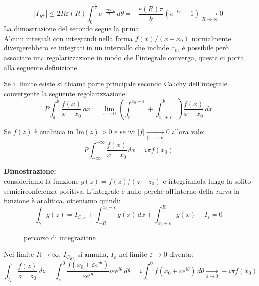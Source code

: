 \[|I_{R^+}| \leq 2R\varepsilon(R)\int_0^{\frac{\pi}{2}} e^{-\frac{2kR}{\pi}\theta}\,d\theta = -\frac{\varepsilon(R)\pi}{k}(e^{-kr}-1) \xrightarrow[R\to \infty]{} 0\]
La dimostrazione del secondo segue la prima.\\
\newline
Alcuni integrali con integrandi nella forma $f(x)/(x-x_0)$ normalmente divergerebbero se integrati in un intervallo che include $x_0$, è possibile però associare una regolarizzazione in modo che l'integrale converga, questo ci porta alla seguente definizione
\begin{dfn}
Se il limite esiste si chiama parte principale secondo Cauchy dell'integrale convergente la seguente regolarizzazione:
\[P\int_a^b\frac{f(x)}{x-x_0}\,dx := \lim_{\varepsilon\to0}\left(\int_a^{x_0-\varepsilon}+\int_{x_0+\varepsilon}^b\right)\frac{f(x)}{x-x_0}\,dx\]
\end{dfn}
\begin{lem}
Se $f(z)$ è analitica in $\text{Im}(z)>0$ e se ivi $|f|\xrightarrow[|z|\to \infty]{} 0$ allora vale:
\[P\int_{-\infty}^{+\infty}\frac{f(x)}{x-x_0}\, dx = i\pi f(x_0)\]
\end{lem}
\hspace{-1.6em}\textbf{Dimostrazione:}\\
consideriamo la funzione $g(z) = f(z)/(z-z_0)$ e integriamola lungo la solito semicirconferenza positiva. L'integrale è nullo perchè all'interno della curva la funzione è analitica, otteniamo quindi:
\[\int_\gamma g(z) = I_{C_{R^+}} + \int_{-R}^{x_0-\varepsilon}g(x)\, dx + \int_{x_0+\varepsilon}^{R}g(x) + I_\varepsilon= 0\]
\begin{figure}[H]
\centering
{}
\caption{percorso di integrazione}
\end{figure}
Nel limite $R\to \infty$, $I_{C_{R^+}}$ si annulla, $I_\varepsilon$ nel limite $\varepsilon\to 0$ diventa:
\[\int_{I_\varepsilon} \frac{f(z)}{z-z_0}\,dz = \int_{\pi}^0 \frac{f(x_0+\varepsilon e^{i\theta})}{\varepsilon e^{i\theta}}i\varepsilon e^{i\theta}\,d\theta = i\int_\pi^0f(x_0+\varepsilon e^{i\theta})\,d\theta \xrightarrow[\varepsilon\to 0]{} -i\pi f(x_0)\]
